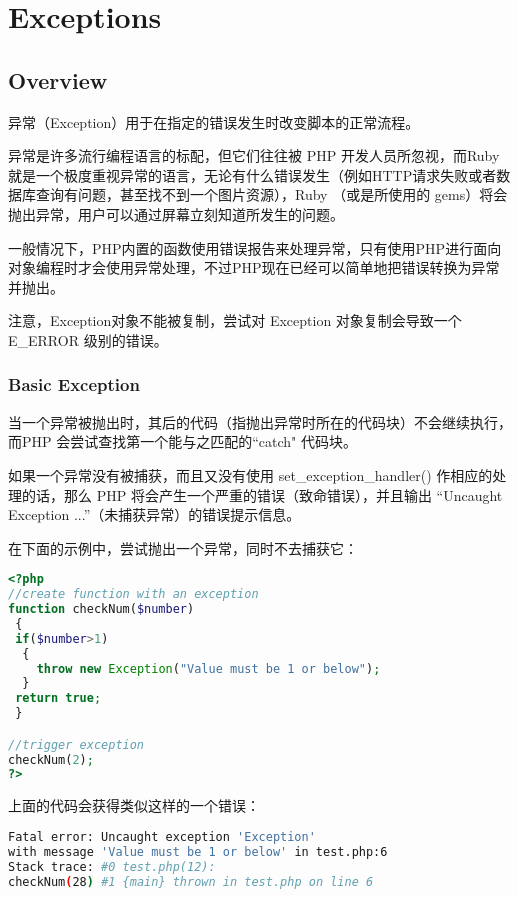 \part{Exceptions}




\chapter{Overview}




异常（Exception）用于在指定的错误发生时改变脚本的正常流程。

异常是许多流行编程语言的标配，但它们往往被 PHP 开发人员所忽视，而Ruby就是一个极度重视异常的语言，无论有什么错误发生（例如HTTP请求失败或者数据库查询有问题，甚至找不到一个图片资源），Ruby （或是所使用的 gems）将会抛出异常，用户可以通过屏幕立刻知道所发生的问题。

一般情况下，PHP内置的函数使用错误报告来处理异常，只有使用PHP进行面向对象编程时才会使用异常处理，不过PHP现在已经可以简单地把错误转换为异常并抛出。

注意，Exception对象不能被复制，尝试对 Exception 对象复制会导致一个 E\_ERROR 级别的错误。

\section{Basic Exception}


当一个异常被抛出时，其后的代码（指抛出异常时所在的代码块）不会继续执行，而PHP 会尝试查找第一个能与之匹配的``catch" 代码块。

如果一个异常没有被捕获，而且又没有使用 set\_exception\_handler() 作相应的处理的话，那么 PHP 将会产生一个严重的错误（致命错误），并且输出 ``Uncaught Exception ...''（未捕获异常）的错误提示信息。



在下面的示例中，尝试抛出一个异常，同时不去捕获它：


\begin{lstlisting}[language=PHP]
<?php
//create function with an exception
function checkNum($number)
 {
 if($number>1)
  {
    throw new Exception("Value must be 1 or below");
  }
 return true;
 }

//trigger exception
checkNum(2);
?>
\end{lstlisting}

上面的代码会获得类似这样的一个错误：


\begin{lstlisting}[language=bash]
Fatal error: Uncaught exception 'Exception' 
with message 'Value must be 1 or below' in test.php:6 
Stack trace: #0 test.php(12): 
checkNum(28) #1 {main} thrown in test.php on line 6
\end{lstlisting}






